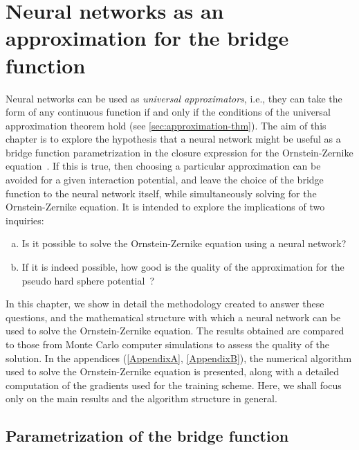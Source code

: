 \chapter{Neural networks as an approximation for the bridge function}
\label{Cap4}


Neural networks can be used as \emph{universal approximators},
i.e., they can take the form of any continuous function if and only if the conditions of the
universal approximation theorem hold (see \autoref{sec:approximation-thm}).
The aim of this chapter is to explore the hypothesis that a neural network might be 
useful as a bridge function parametrization in the closure expression for the 
Ornstein-Zernike equation~\cite{hansenTheorySimpleLiquids2013}.
If this is true, then choosing a particular approximation can be avoided for a given 
interaction potential, and leave the choice of the bridge function to the neural network 
itself, while simultaneously solving for the Ornstein-Zernike equation. It is intended to
explore the implications of two inquiries:

\begin{enumerate}[(a)]
    \item Is it possible to solve the Ornstein-Zernike equation using a neural network?
    \item If it is indeed possible, how good is the quality of the approximation for the pseudo hard sphere potential~\cite{baezUsingSecondVirial2018}?
\end{enumerate}

In this chapter, we show in detail the methodology created to answer these questions, and
the mathematical structure with which a neural network can be used to solve the
Ornstein-Zernike equation.
The results obtained are compared to those from Monte Carlo computer simulations to assess 
the quality of the solution.
In the appendices (\autoref{AppendixA}, \autoref{AppendixB}), the numerical algorithm used 
to solve the Ornstein-Zernike equation
is presented, along with a detailed computation of the gradients used for the
training scheme. Here, we shall focus only on the main results and the algorithm structure
in general.

\section{Parametrization of the bridge function}

